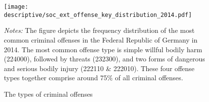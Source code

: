 


\vspace*{\fill}
\begin{figure}[H]\centering
	\texttt{[image: descriptive/soc\_ext\_offense\_key\_distribution\_2014.pdf]}
	\begin{minipage}{0.95\linewidth}
		\caption{The types of criminal offenses}\label{fig_soc_ext:offense_types_distribution_2014}
		\scriptsize{\emph{Notes:} The figure depicts the frequency distribution of the most common criminal offenses in the Federal Republic of Germany in 2014. The most common offense type is simple willful bodily harm (224000), followed by threats (232300), and two forms of dangerous and serious bodily injury (222110 \& 222010). These four offense types together comprise around 75\% of all criminal offenses.}
	\end{minipage}
\end{figure}
\vspace*{\fill}\clearpage

